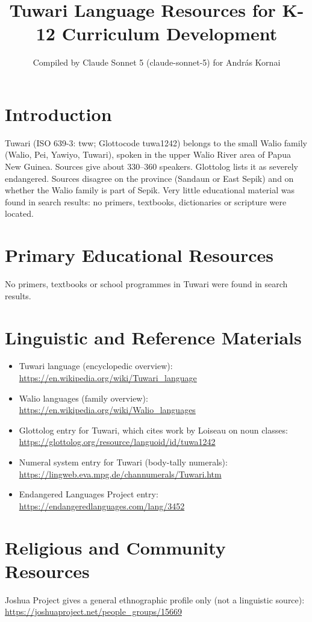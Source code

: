 \documentclass[12pt]{article}
\title{Tuwari Language Resources for K-12 Curriculum Development}
\author{Compiled by Claude Sonnet 5 (claude-sonnet-5) for Andr\'as Kornai}
\date{}
\begin{document}
\maketitle

\section{Introduction}
Tuwari (ISO 639-3: tww; Glottocode tuwa1242) belongs to the small Walio family (Walio, Pei, Yawiyo, Tuwari), spoken in the upper Walio River area of Papua New Guinea. Sources give about 330--360 speakers. Glottolog lists it as severely endangered. Sources disagree on the province (Sandaun or East Sepik) and on whether the Walio family is part of Sepik. Very little educational material was found in search results: no primers, textbooks, dictionaries or scripture were located.

\section{Primary Educational Resources}
No primers, textbooks or school programmes in Tuwari were found in search results.

\section{Linguistic and Reference Materials}
\begin{itemize}
\item Tuwari language (encyclopedic overview): \url{https://en.wikipedia.org/wiki/Tuwari_language}
\item Walio languages (family overview): \url{https://en.wikipedia.org/wiki/Walio_languages}
\item Glottolog entry for Tuwari, which cites work by Loiseau on noun classes: \url{https://glottolog.org/resource/languoid/id/tuwa1242}
\item Numeral system entry for Tuwari (body-tally numerals): \url{https://lingweb.eva.mpg.de/channumerals/Tuwari.htm}
\item Endangered Languages Project entry: \url{https://endangeredlanguages.com/lang/3452}
\end{itemize}

\section{Religious and Community Resources}
Joshua Project gives a general ethnographic profile only (not a linguistic source): \url{https://joshuaproject.net/people_groups/15669}
\end{document}

